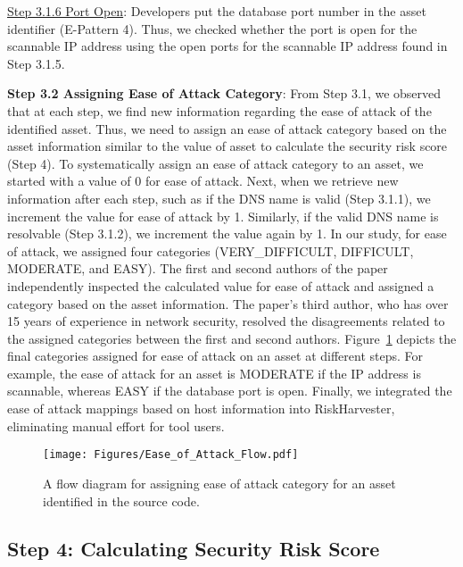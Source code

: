 \uline{Step 3.1.6 Port Open}: Developers put the database port number in the asset identifier (E-Pattern 4). Thus, we checked whether the port is open for the scannable IP address using the open ports for the scannable IP address found in Step 3.1.5.

\textbf{Step 3.2 Assigning Ease of Attack Category}: From Step 3.1, we observed that at each step, we find new information regarding the ease of attack of the identified asset. Thus, we need to assign an ease of attack category based on the asset information similar to the value of asset to calculate the security risk score (Step 4). To systematically assign an ease of attack category to an asset, we started with a value of 0 for ease of attack. Next, when we retrieve new information after each step, such as if the DNS name is valid (Step 3.1.1), we increment the value for ease of attack by 1. Similarly, if the valid DNS name is resolvable (Step 3.1.2), we increment the value again by 1. In our study, for ease of attack, we assigned four categories (VERY\_DIFFICULT, DIFFICULT, MODERATE, and EASY). The first and second authors of the paper independently inspected the calculated value for ease of attack and assigned a category based on the asset information. The paper's third author, who has over 15 years of experience in network security, resolved the disagreements related to the assigned categories between the first and second authors. Figure~\ref{fig:ease-of-attack} depicts the final categories assigned for ease of attack on an asset at different steps. For example, the ease of attack for an asset is MODERATE if the IP address is scannable, whereas EASY if the database port is open. Finally, we integrated the ease of attack mappings based on host information into RiskHarvester, eliminating manual effort for tool users.

\begin{figure}[!t]
\centering
    \texttt{[image: Figures/Ease\_of\_Attack\_Flow.pdf]}
    \caption{A flow diagram for assigning ease of attack category for an asset identified in the source code.}
    \label{fig:ease-of-attack}  
\end{figure}


\subsection{Step 4: Calculating Security Risk Score}


